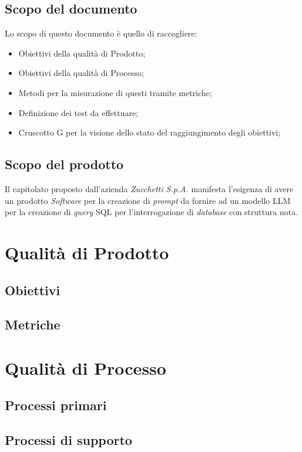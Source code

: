 \documentclass[5pt]{article}
\begin{document}
	\subsection{Scopo del documento}
	Lo scopo di questo documento è quello di raccogliere:
	\begin{itemize}
		\item Obiettivi della qualità di Prodotto;
		\item Obiettivi della qualità di Processo;
		\item Metodi per la misurazione di questi tramite metriche;
		\item Definizione dei test da effettuare;
		\item Cruscotto G per la visione dello stato del raggiungimento degli obiettivi;
	\end{itemize}
	
	\subsection{Scopo del prodotto}
	Il capitolato proposto dall'azienda \textit{Zucchetti S.p.A.} manifesta l'esigenza di avere un prodotto \textit{Software} per la creazione di \textit{prompt} da fornire ad un modello LLM per la creazione di \textit{query} SQL per l'interrogazione di \textit{database} con struttura nota.
	
	
	\section{Qualità di Prodotto}
	
	\subsection{Obiettivi}
	
	\subsection{Metriche}



	\section{Qualità di Processo}
	
	\subsection{Processi primari}
	
	\subsection{Processi di supporto}
	
\end{document}
